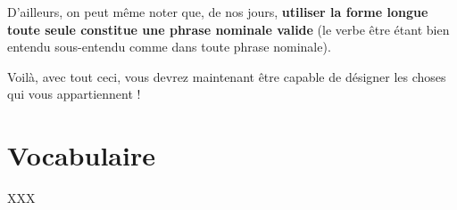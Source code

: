 D'ailleurs, on peut même noter que, de nos jours, \textbf{utiliser la forme longue toute seule constitue une phrase nominale valide} (le verbe être étant bien entendu sous-entendu comme dans toute phrase nominale).

Voilà, avec tout ceci, vous devrez maintenant être capable de désigner les choses qui vous appartiennent !  

\section*{Vocabulaire}
XXX